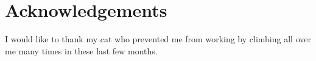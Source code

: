 \chapter*{Acknowledgements}

I would like to thank my cat who prevented me from working by climbing all over me many times in these last few months.

\begin{comment}

Attempting to complete a PhD has been a great undertaking, and in completing
this thesis I am nearing the end of an important chapter in my life.  The years
I have spent as a postgraduate researcher have probably been the happiest of my
life, but at times the work involved has been tough, and without the support of
people around me I certainly couldn't have made it this far.  Almost everyone I
have met and got to know during this period has touched my life in a positive
way, but there are a few people in particular that I wish to thank.

Firstly, I would like to thank my supervisor James D.~Mitchell, for his honesty
and friendliness, and for the many hours he has spent correcting my work and
making me a better mathematician.  Secondly, I would like to thank my friend and
office-mate Wilf Wilson, whose wonderful company has kept me from falling asleep
through many weary afternoons of writing and coding.  I am also indebted to the
Engineering and Physical Sciences Research Council (EPSRC), whose generous grant
has allowed me to pursue computational semigroup theory freely for the last four
years.

Finally, I wish to thank Claire Young.  She has been the most important part of
my life throughout my postgraduate career, and her love and support during the
tougher moments of this PhD have given me the motivation to overcome what
sometimes felt like insurmountable obstacles.

\begin{flushright}
  Michael Torpey

  \singlespacing
  \textit{St Andrews \\July 2018}
\end{flushright}

\vspace{2.0em}
\noindent
Having completed the final version of this thesis, I also wish to thank my
examiners Martyn Quick and Wolfram Bentz, for the time and effort they spent
reading my work, conducting my viva, and providing the detailed feedback that
helped me improve this thesis to its current state.

\begin{flushright}
  Michael Torpey

  \singlespacing
  \textit{St Andrews \\February 2019}
\end{flushright}

\end{comment}

